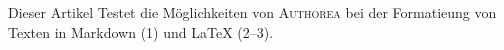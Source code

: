 Dieser Artikel Testet die Möglichkeiten von \textsc{Authorea} bei der Formatieung von Texten in Markdown (1) und LaTeX (2–3).
